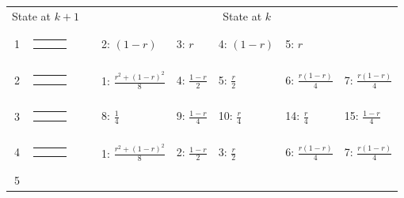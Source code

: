 \documentclass[9pt,letterpaper,twoside]{article}
\begin{document}
\bigskip

{
\begin{center}
\begin{tabular}{ccclllll} \hline
\multicolumn{2}{c}{State at $k+1$} & &
\multicolumn{5}{c}{State at $k$} \\
\cline{1-2} \cline{4-8}
1 &
{\renewcommand{\arraystretch}{0.3}
\renewcommand{\tabcolsep}{0.5mm}
\parbox[b][3mm][c]{12mm}{
\begin{tabular}{|p{2mm}|p{2mm}||p{2mm}|} \hline
$\bullet$ & $\bullet$ &           \\
$\bullet$ & $\circ  $ &           \\ \hline
\end{tabular}}}
&
& 2: $(1-r)$
& 3: $r$
& 4: $(1-r)$
& 5: $r$
& \\
2 &
{\renewcommand{\arraystretch}{0.3}
\renewcommand{\tabcolsep}{0.5mm}
\parbox[b][3mm][c]{12mm}{
\begin{tabular}{|p{2mm}|p{2mm}||p{2mm}|} \hline
$\bullet$ &           & $\bullet$ \\
$\bullet$ &           & $\circ  $ \\ \hline
\end{tabular}}}
&
& 1: $\frac{r^2+(1-r)^2}{8}$
& 4: $\frac{1-r}{2}$
& 5: $\frac{r}{2}$
& 6: $\frac{r(1-r)}{4}$
& 7: $\frac{r(1-r)}{4}$
\\
3 &
{\renewcommand{\arraystretch}{0.3}
\renewcommand{\tabcolsep}{0.5mm}
\parbox[b][3mm][c]{12mm}{
\begin{tabular}{|p{2mm}|p{2mm}||p{2mm}|} \hline
$\bullet$ &           & $\bullet$ \\
          & $\bullet$ & $\circ  $ \\ \hline
\end{tabular}}}
&
& 8: $\frac{1}{4}$
& 9: $\frac{1-r}{4}$
& 10: $\frac{r}{4}$
& 14: $\frac{r}{4}$
& 15: $\frac{1-r}{4}$
\\
4 &
{\renewcommand{\arraystretch}{0.3}
\renewcommand{\tabcolsep}{0.5mm}
\parbox[b][3mm][c]{12mm}{
\begin{tabular}{|p{2mm}|p{2mm}||p{2mm}|} \hline
$\bullet$ &           & $\bullet$ \\
$\circ  $ &           & $\bullet$ \\ \hline
\end{tabular}}}
&
& 1: $\frac{r^2+(1-r)^2}{8}$
& 2: $\frac{1-r}{2}$
& 3: $\frac{r}{2}$
& 6: $\frac{r(1-r)}{4}$
& 7: $\frac{r(1-r)}{4}$
\\
5 &
{\renewcommand{\arraystretch}{0.3}
\renewcommand{\tabcolsep}{0.5mm}
\parbox[b][3mm][c]{12mm}{
}}
\end{tabular}
\end{center}}
\end{document}
